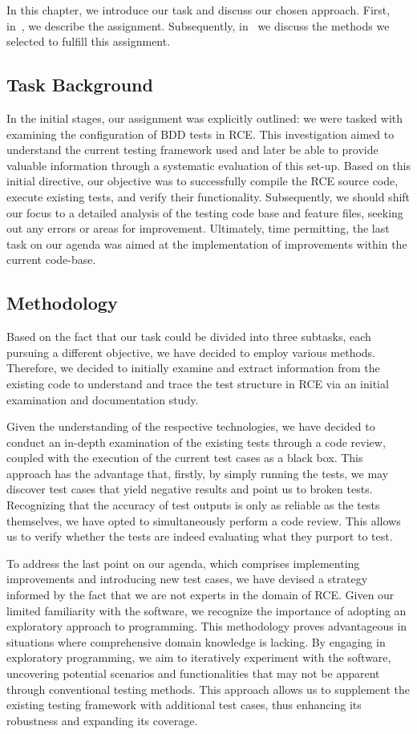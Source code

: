 \label{sec:method}
In this chapter, we introduce our task and discuss our chosen approach. First, in~, we describe the assignment. Subsequently, in~ we discuss the methods we selected to fulfill this assignment.

\subsection{Task Background}
\label{subsec:Task}
In the initial stages, our assignment was explicitly outlined: we were tasked with examining the configuration of \ac{BDD} tests in \ac{RCE}. This investigation aimed to understand the current testing framework used and later be able to provide valuable information through a systematic evaluation of this set-up. Based on this initial directive, our objective was to successfully compile the \ac{RCE} source code, execute existing tests, and verify their functionality. Subsequently, we should shift our focus to a detailed analysis of the testing code base and feature files, seeking out any errors or areas for improvement. Ultimately, time permitting, the last task on our agenda was aimed at the implementation of improvements within the current code-base.

\subsection{Methodology}
\label{subsec:Methodologies}
Based on the fact that our task could be divided into three subtasks, each pursuing a different objective, we have decided to employ various methods. Therefore, we decided to initially examine and extract information from the existing code to understand and trace the test structure in \ac{RCE} via an initial examination and documentation study.

Given the understanding of the respective technologies, we have decided to conduct an in-depth examination of the existing tests through a code review, coupled with the execution of the current test cases as a black box. This approach has the advantage that, firstly, by simply running the tests, we may discover test cases that yield negative results and point us to broken tests. Recognizing that the accuracy of test outputs is only as reliable as the tests themselves, we have opted to simultaneously perform a code review. This allows us to verify whether the tests are indeed evaluating what they purport to test. 

To address the last point on our agenda, which comprises implementing improvements and introducing new test cases, we have devised a strategy informed by the fact that we are not experts in the domain of \ac{RCE}. Given our limited familiarity with the software, we recognize the importance of adopting an exploratory approach to programming. This methodology proves advantageous in situations where comprehensive domain knowledge is lacking. By engaging in exploratory programming, we aim to iteratively experiment with the software, uncovering potential scenarios and functionalities that may not be apparent through conventional testing methods. This approach allows us to supplement the existing testing framework with additional test cases, thus enhancing its robustness and expanding its coverage.